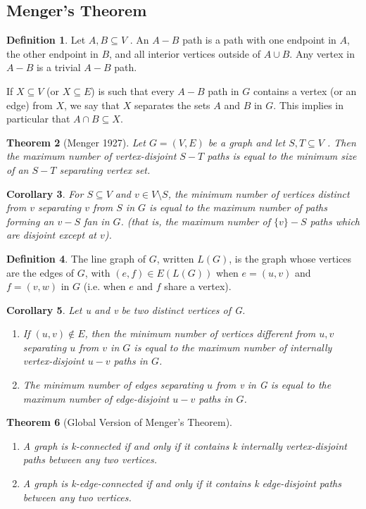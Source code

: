 \documentclass[10pt, fleqn, a4paper, landscape]{article}
\theoremstyle{plain} %
\newtheorem{thm}{Theorem}
\newtheorem{cor}[thm]{Corollary}
\theoremstyle{remark} %
\theoremstyle{definition} %
\newtheorem{defi}[thm]{Definition}
\begin{document}
\begin{multicols}{3}
\begin{tiny}
\subsection{Menger’s Theorem}

\begin{defi}
Let $A,B \subseteq V$ . An $A-B$ path is a path with one endpoint in $A$, the other endpoint in $B$, and all interior vertices outside of $A \cup B$. Any vertex in $A - B$ is a trivial $A-B$ path.

If $X \subseteq V$ (or $X \subseteq E$) is such that every $A-B$ path in $G$ contains a vertex (or an edge) from $X$, we say that $X$ separates the sets $A$ and $B$ in $G$. This implies in particular that $A \cap B \subseteq X$.
\end{defi}
\begin{thm}[Menger 1927]
Let $G = (V,E)$ be a graph and let $S, T \subseteq V$ . Then the maximum
number of vertex-disjoint $S-T$ paths is equal to the minimum size of an $S-T$ separating vertex set.
\end{thm}

\begin{cor}
For $S \subseteq V$ and $v\in V \setminus S$, the minimum number of vertices distinct from $v$ separating $v$ from $S$ in $G$ is equal to the maximum number of paths forming an $v-S$ fan in $G$. (that is, the maximum number of $\{v\}-S$ paths which are disjoint except at $v$).
\end{cor}

\begin{defi}
The line graph of $G$, written $L(G)$, is the graph whose vertices are the edges of $G$, with $(e, f) \in E(L(G))$ when $e = (u, v)$ and $f = (v,w)$ in $G$ (i.e. when $e$ and $f$ share a vertex).
\end{defi}
\addtocounter{thm}{1}
\begin{cor}
Let u and v be two distinct vertices of G.
\begin{enumerate}
\item If $(u, v) \notin E$, then the minimum number of vertices different from $u, v$ separating $u$ from $v$ in $G$ is equal to the maximum number of internally vertex-disjoint $u-v$ paths in $G$.
\item The minimum number of edges separating $u$ from v in G is equal to the maximum number of edge-disjoint $u-v$ paths in $G$.
\end{enumerate}
\end{cor}

\begin{thm}[Global Version of Menger’s Theorem]
\begin{enumerate}
\item A graph is k-connected if and only if it contains k internally vertex-disjoint paths between any
two vertices.
\item A graph is k-edge-connected if and only if it contains k edge-disjoint paths between any two
vertices.
\end{enumerate}
\end{thm}


\end{tiny}
\end{multicols}
\end{document}
